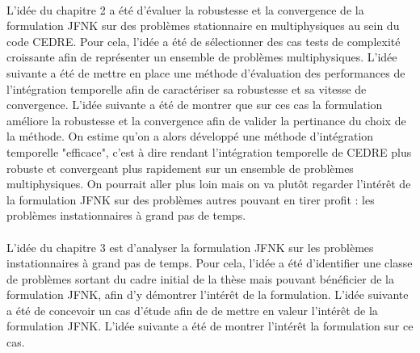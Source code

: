     \paragraph{}
    L'idée du chapitre 2 a été d'évaluer la robustesse et la convergence de la formulation JFNK sur des problèmes stationnaire en multiphysiques au sein du code CEDRE.
    Pour cela, l'idée a été de sélectionner des cas tests de complexité croissante afin de représenter un ensemble de problèmes multiphysiques.
    L'idée suivante a été de mettre en place une méthode d'évaluation des performances de l'intégration temporelle afin de caractériser sa robustesse et sa vitesse de convergence.
    L'idée suivante a été de montrer que sur ces cas la formulation améliore la robustesse et la convergence afin de valider la pertinance du choix de la méthode.
    On estime qu'on a alors développé une méthode d'intégration temporelle "efficace", c'est à dire rendant l'intégration temporelle de CEDRE plus robuste et convergeant plus rapidement sur un ensemble de problèmes multiphysiques.
    On pourrait aller plus loin mais on va plutôt regarder l'intérêt de la formulation JFNK sur des problèmes autres pouvant en tirer profit : les problèmes instationnaires à grand pas de temps.

    \paragraph{}
    L'idée du chapitre 3 est d'analyser la formulation JFNK sur les problèmes instationnaires à grand pas de temps.
    Pour cela, l'idée a été d'identifier une classe de problèmes sortant du cadre initial de la thèse mais pouvant bénéficier de la formulation JFNK, afin d'y démontrer l'intérêt de la formulation.
    L'idée suivante a été de concevoir un cas d'étude afin de de mettre en valeur l'intérêt de la formulation JFNK.
    L'idée suivante a été de montrer l’intérêt la formulation sur ce cas.
